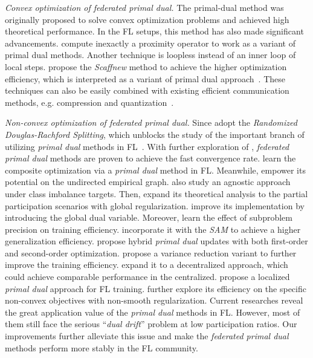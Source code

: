 \textit{Convex optimization of federated primal dual.} The primal-dual method was originally proposed to solve convex optimization problems and achieved high theoretical performance. In the FL setups, this method has also made significant advancements. \citet{grudzien2023can} compute inexactly a proximity operator to work as a variant of primal dual methods. Another technique is loopless instead of an inner loop of local steps. \citet{mishchenko2022proxskip} propose the \textit{Scaffnew} method to achieve the higher optimization efficiency, which is interpreted as a variant of primal dual approach~\citep{condat2022randprox}. These techniques can also be easily combined with existing efficient communication methods, e.g. compression and quantization~\citep{grudzien2023improving,condat2023tamuna}.

\textit{Non-convex optimization of federated primal dual.} Since \citet{tran2021feddr} adopt the \textit{Randomized Douglas-Rachford Splitting}, which unblocks the study of the important branch of utilizing \textit{primal dual} methods in FL~\citep{pathak2020fedsplit}. With further exploration of \citet{zhang2021fedpd}, \textit{federated primal dual} methods are proven to achieve the fast convergence rate. \citet{yuan2021federated} learn the composite optimization via a \textit{primal dual} method in FL. Meanwhile, \citet{sarcheshmehpour2021federated} empower its potential on the undirected empirical graph. \citet{shen2021agnostic} also study an agnostic approach under class imbalance targets. Then, \citet{gong2022fedadmm,wang2022fedadmm} expand its theoretical analysis to the partial participation scenarios with global regularization. \citet{durmus2021federated} improve its implementation by introducing the global dual variable. Moreover, \citet{zhou2023federated} learn the effect of subproblem precision on training efficiency. \citet{sun2023fedspeed,sun2023dynamic} incorporate it with the \textit{SAM} to achieve a higher generalization efficiency. \citet{niu2023fedhybrid} propose hybrid \textit{primal dual} updates with both first-order and second-order optimization. \citet{wang2023beyond} propose a variance reduction variant to further improve the training efficiency. \citet{li2023dfedadmm} expand it to a decentralized approach, which could achieve comparable performance in the centralized. \citet{tyou2023localized} propose a localized \textit{primal dual} approach for FL training. \citet{li2023privacy} further explore its efficiency on the specific non-convex objectives with non-smooth regularization. Current researches reveal the great application value of the \textit{primal dual} methods in FL. However, most of them still face the serious ``\textit{dual drift}'' problem at low participation ratios. Our improvements further alleviate this issue and make the \textit{federated primal dual} methods perform more stably in the FL community.